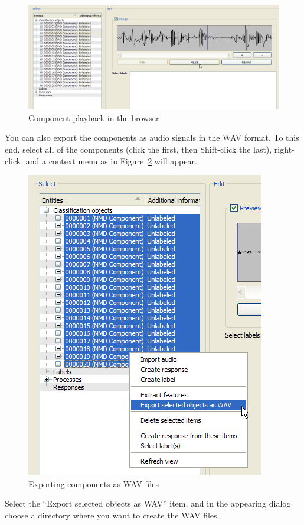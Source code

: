 \begin{figure}
    \centering
    \includegraphics[width=\textwidth]{tutorial-media/BrowserPlayback.png}
    \caption{%
        \label{figure:TutorialBrowserPlayback}%
        Component playback in the browser
    }
\end{figure}

\noindent You can also export the components as audio signals in the WAV
format. To this end, select all of the components (click the first, then
Shift-click the last), right-click, and a context menu as in
Figure~\ref{figure:TutorialExportAsWav} will appear.

\begin{figure}
    \centering
    \includegraphics[width=.6\textwidth]{tutorial-media/ExportAsWav.png}
    \caption{%
        \label{figure:TutorialExportAsWav}%
        Exporting components as WAV files
    }
\end{figure}

Select the ``Export selected objects as WAV'' item, and in the appearing dialog
choose a directory where you want to create the WAV files.

